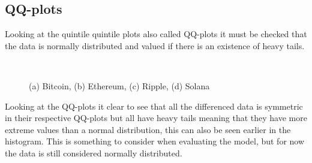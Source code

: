 \subsection{QQ-plots}

Looking at the quintile quintile plots also called QQ-plots it must be checked that the data is normally distributed and valued if there is an existence of heavy tails.
\begin{figure}[H]
  \centering
  \quad
  \\
  \quad
  \caption{(a) Bitcoin, (b) Ethereum, (c) Ripple, (d) Solana }
\end{figure}
Looking at the QQ-plots it clear to see that all the differenced data is symmetric in their respective QQ-plots but all have heavy tails meaning that they have more extreme values than a normal distribution, this can also be seen earlier in the histogram. This is something to consider when evaluating the model, but for now the data is still considered normally distributed.